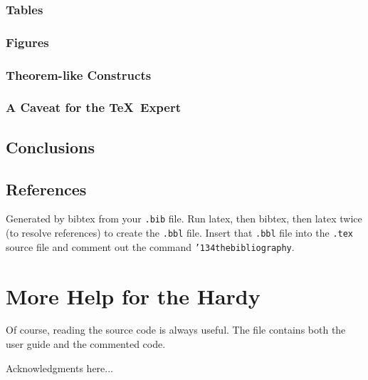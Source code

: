 \subsubsection{Tables}
\subsubsection{Figures}
\subsubsection{Theorem-like Constructs}
\subsubsection*{A Caveat for the \TeX\ Expert}
\subsection{Conclusions}
\subsection{References}
Generated by bibtex from your \texttt{.bib} file.  Run latex,
then bibtex, then latex twice (to resolve references)
to create the \texttt{.bbl} file.  Insert that \texttt{.bbl}
file into the \texttt{.tex} source file and comment out
the command \texttt{{\char'134}thebibliography}.
\section{More Help for the Hardy}

Of course, reading the source code is always useful.  The file
 contains both the user guide and the commented
code.

\begin{acks}
  Acknowledgments here...

\end{acks}
